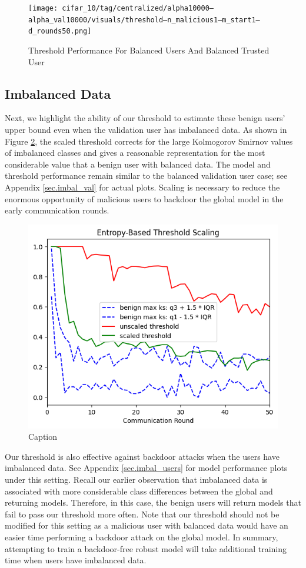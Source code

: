 \documentclass{article} %
\begin{document}
\begin{figure}[H]
    \centering
    \texttt{[image: cifar\_10/tag/centralized/alpha10000--alpha\_val10000/visuals/threshold--n\_malicious1--m\_start1--d\_rounds50.png]}
    \caption{Threshold Performance For Balanced Users And Balanced Trusted User}
    \label{fig:centralized--balanced--threshold}
\end{figure}

%
\subsection{Imbalanced Data}

Next, we highlight the ability of our threshold to estimate these benign users' upper bound even when the validation user has imbalanced data. As shown in Figure \ref{fig:centralized--alpha10000--alpha_val1--scaling--d_rounds50.png}, the scaled threshold corrects for the large Kolmogorov Smirnov values of imbalanced classes and gives a reasonable representation for the most considerable value that a benign user with balanced data. The model and threshold performance remain similar to the balanced validation user case; see Appendix \ref{sec.imbal_val} for actual plots. Scaling is necessary to reduce the enormous opportunity of malicious users to backdoor the global model in the early communication rounds.

\begin{figure}[H]
    \centering
    \includegraphics[width=.5\textwidth]{01_trusted/centralized/alpha10000--alpha_val1/visuals/scaling--n_malicious1--m_start1--d_rounds50.png}
    \caption{Caption}
    \label{fig:centralized--alpha10000--alpha_val1--scaling--d_rounds50.png}
\end{figure}

Our threshold is also effective against backdoor attacks when the users have imbalanced data. See Appendix \ref{sec.imbal_users} for model performance plots under this setting. Recall our earlier observation that imbalanced data is associated with more considerable class differences between the global and returning models. Therefore, in this case, the benign users will return models that fail to pass our threshold more often. Note that our threshold should not be modified for this setting as a malicious user with balanced data would have an easier time performing a backdoor attack on the global model. In summary, attempting to train a backdoor-free robust model will take additional training time when users have imbalanced data.
\end{document}
